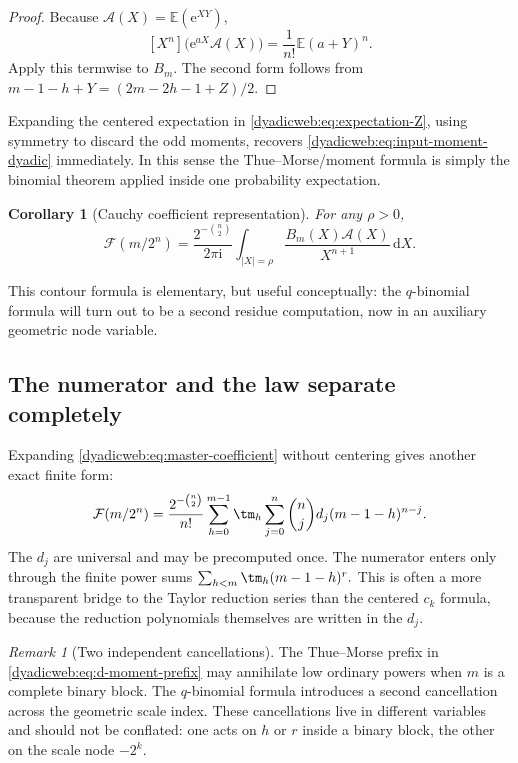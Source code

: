 \documentclass[11pt,oneside]{article}
\newtheorem{corollary}[corollary]{Corollary}
\theoremstyle{definition}
\theoremstyle{remark}
\newtheorem{remark}[remark]{Remark}
\newcommand{\e}{\mathrm e}
\newcommand{\ii}{\mathrm i}
\newcommand{\dd}{\,\mathrm d}
\newcommand{\E}{\mathbb E}
\begin{document}
\begin{proof}
Because $\mathscr A(X)=\E(\e^{XY})$,
\[
 [X^n]\bigl(\e^{aX}\mathscr A(X)\bigr)
 =\frac1{n!}\E(a+Y)^n.
\]
Apply this termwise to $B_m$.  The second form follows from
$m-1-h+Y=(2m-2h-1+Z)/2$.
\end{proof}

Expanding the centered expectation in \eqref{dyadicweb:eq:expectation-Z}, using symmetry to discard the
odd moments, recovers \eqref{dyadicweb:eq:input-moment-dyadic} immediately.  In this sense the
Thue--Morse/moment formula is simply the binomial theorem applied inside one probability
expectation.

\begin{corollary}[Cauchy coefficient representation]
\label{dyadicweb:cor:cauchy-X}
For any $\rho>0$,
\begin{equation}
 \mathcal F(m/2^n)
 =\frac{2^{-\binom n2}}{2\pi\ii}
  \int_{|X|=\rho}\frac{B_m(X)\mathscr A(X)}{X^{n+1}}\dd X. \label{dyadicweb:eq:cauchy-X}
\end{equation}
\end{corollary}

This contour formula is elementary, but useful conceptually: the $q$-binomial formula will
turn out to be a second residue computation, now in an auxiliary geometric node variable.

\subsection{The numerator and the law separate completely}

Expanding \eqref{dyadicweb:eq:master-coefficient} without centering gives another exact finite form:
\begin{equation}
 \mathcal F(m/2^n)
 =\frac{2^{-\binom n2}}{n!}
 \sum_{h=0}^{m-1}\tm_h
 \sum_{j=0}^{n}\binom njd_j(m-1-h)^{n-j}.                 \label{dyadicweb:eq:d-moment-prefix}
\end{equation}
The $d_j$ are universal and may be precomputed once.  The numerator enters only through the
finite power sums
\(
 \sum_{h<m}\tm_h(m-1-h)^r.
\)
This is often a more transparent bridge to the Taylor reduction series than the centered
$c_k$ formula, because the reduction polynomials themselves are written in the $d_j$.

\begin{remark}[Two independent cancellations]
The Thue--Morse prefix in \eqref{dyadicweb:eq:d-moment-prefix} may annihilate low ordinary powers when
$m$ is a complete binary block.  The $q$-binomial formula introduces a second cancellation
across the geometric scale index.  These cancellations live in different variables and should
not be conflated: one acts on $h$ or $r$ inside a binary block, the other on the scale node
$-2^k$.
\end{remark}
\end{document}
